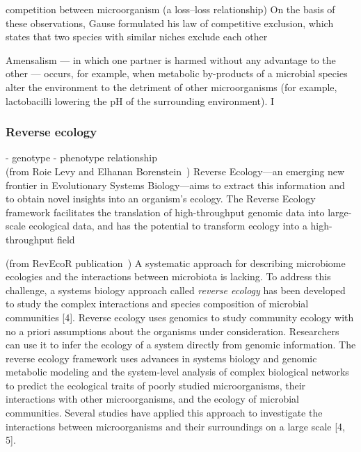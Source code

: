       competition between microorganism (a loss–loss relationship)
      On the basis of
      these observations, Gause formulated his law of competitive exclusion, which states that two species with
      similar niches exclude each other

      Amensalism — in which one partner is harmed without any advantage to the other — occurs, for example,
      when metabolic by-products of a microbial species
      alter the environment to the detriment of other microorganisms (for example, lactobacilli lowering the pH
      of the surrounding environment). I



      \subsubsection*{Reverse ecology}


         - genotype - phenotype relationship \\

         (from Roie Levy and Elhanan Borenstein~\cite{levy2012reverse})
         Reverse Ecology—an emerging new frontier in Evolutionary Systems Biology—aims
         to extract this information and to obtain novel insights into an organism’s ecology.
         The Reverse Ecology framework facilitates the translation of high-throughput
         genomic data into large-scale ecological data, and has the potential to transform
         ecology into a high-throughput field




         (from RevEcoR publication~\cite{cao2016revecor})
         A systematic approach for describing microbiome ecologies and the interactions between microbiota is lacking. 
         To address this challenge, a systems biology approach called \textit{reverse ecology} has been developed 
         to study the complex interactions and species composition of microbial communities [4]. 
         Reverse ecology uses genomics to study community ecology with no a priori assumptions about the organisms under consideration. 
         Researchers can use it to infer the ecology of a system directly from genomic information. 
         The reverse ecology framework uses advances in systems biology and genomic metabolic modeling and 
         the system-level analysis of complex biological networks to predict the ecological traits of poorly studied microorganisms, 
         their interactions with other microorganisms, and the ecology of microbial communities. 
         Several studies have applied this approach to investigate the interactions between microorganisms 
         and their surroundings on a large scale [4, 5].


